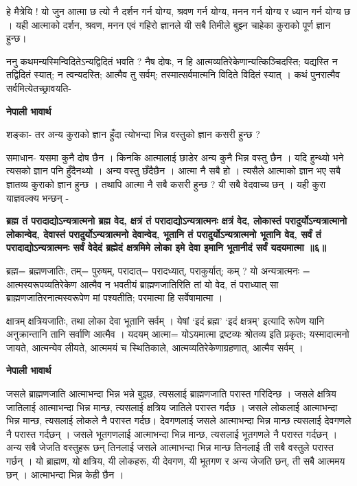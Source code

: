 \documentclass[11pt, a5paper]{article}
\begin{document}
हे मैत्रेयि ! यो जुन आत्मा छ त्यो नै दर्शन गर्न योग्य, श्रवण गर्न योग्य, मनन गर्न योग्य र ध्यान गर्न योग्य छ । यही आत्माको दर्शन, श्रवण, मनन एवं गहिरो ज्ञानले यी सबै तिमीले बुझ्न चाहेका कुराको पूर्ण ज्ञान हुन्छ।

ननु कथमन्यस्मिन्विदितेऽन्यद्विदितं भवति ? नैष दोषः, न हि आत्मव्यतिरेकेणान्यत्किञ्चिदस्ति; यद्यस्ति न तद्विदितं स्यात्; न त्वन्यदस्ति; आत्मैव तु सर्वम्; तस्मात्सर्वमात्मनि विदिते विदितं स्यात् । कथं पुनरात्मैव सर्वमित्येतच्छ्रावयति-

\textbf{नेपाली भावार्थ}

शङ्का- तर अन्य कुराको ज्ञान हुँदा त्योभन्दा भिन्न वस्तुको ज्ञान कसरी हुन्छ ?

समाधान- यसमा कुनै दोष छैन । किनकि आत्मालाई छाडेर अन्य कुनै भिन्न वस्तु छैन । यदि हुन्थ्यो भने त्यसको ज्ञान पनि हुँदैनथ्यो । अन्य वस्तु छँदैछैन । आत्मा नै सबै हो । त्यसैले आत्माको ज्ञान भए सबै ज्ञातव्य कुराको ज्ञान हुन्छ । तथापि आत्मा नै सबै कसरी हुन्छ ? यी सबै वेदवाच्य छन् । यही कुरा याज्ञवल्क्य भन्छन् -

\textbf{ब्रह्म तं परादाद्योऽन्यत्रात्मनो ब्रह्म वेद, क्षत्रं तं परादाद्योऽन्यत्रात्मनः क्षत्रं वेद, लोकास्तं परादुर्योऽन्यत्रात्मानो लोकान्वेद, देवास्तं परादुर्योऽन्यत्रात्मनो देवान्वेद, भूतानि तं परादुर्योऽन्यत्रात्मनो भूतानि वेद, सर्वं तं परादाद्योऽन्यत्रात्मनः सर्वं वेदेदं ब्रह्मेदं क्षत्रमिमे लोका इमे देवा इमानि भूतानीदं सर्वं यदयमात्मा ॥६॥}

ब्रह्म= ब्रह्मणजातिः, तम्= पुरुषम्, परादात्= परादध्यात्, पराकुर्यात्; कम् ? यो अन्यत्रात्मनः = आत्मस्वरूपव्यतिरेकेण आत्मैव न भवतीयं ब्राह्मणजातिरिति तां यो वेद, तं पराध्यात्  सा ब्राह्मणजातिरनात्मस्वरूपेण मां पश्यतीति; परमात्मा हि सर्वेषामात्मा ।

क्षात्रम् क्षत्रियजातिः, तथा लोका देवा भूतानि सर्वम् । येषां ‘इदं ब्रह्म’ ‘इदं क्षत्रम्’ इत्यादि रूपेण यानि अनुक्रान्तानि तानि सर्वाणि आत्मैव । यदयम् आत्मा= योऽयमात्मा द्रष्टव्यः श्रोतव्य इति प्रकृतः; यस्मादात्मनो जायते, आत्मन्येव लीयते, आत्ममयं च स्थितिकाले, आत्मव्यतिरेकेणाग्रहणात्, आत्मैव सर्वम् ।

\textbf{नेपाली भावार्थ}

जसले ब्राह्मणजाति आत्माभन्दा भिन्न भन्ने बुझ्छ, त्यसलाई ब्राह्मणजाति परास्त गरिदिन्छ । जसले क्षत्रिय जातिलाई आत्माभन्दा भिन्न मान्छ, त्यसलाई क्षत्रिय जातिले परास्त गर्दछ । जसले लोकलाई आत्माभन्दा भिन्न मान्छ, त्यसलाई लोकले नै परास्त गर्दछ। देवगणलाई जसले आत्माभन्दा भिन्न मान्छ त्यसलाई देवगणले नै परास्त गर्दछन् । जसले भूतगणलाई आत्माभन्दा भिन्न मान्छ, त्यसलाई भूतगणले नै परास्त गर्दछन् । अन्य सबै जेजति वस्तुहरू छन् तिनलाई जसले आत्माभन्दा भिन्न मान्छ तिनलाई ती सबै वस्तुले परास्त गर्छन् । यो ब्राह्मण, यो क्षत्रिय, यी लोकहरू, यी देवगण, यी भूतगण र अन्य जेजति छन्, ती सबै आत्ममय छन् । आत्माभन्दा भिन्न केही छैन ।
\end{document}

